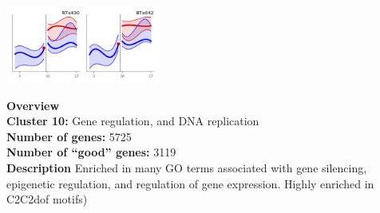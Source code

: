 \begin{multicols}{2}
\includegraphics[width=2in]{figures/clusters/root_Postflowering_9.png}
\columnbreak

\noindent \textbf{Overview}\\\textbf{Cluster 10:} Gene regulation, and DNA replication \\
\textbf{Number of genes:} 5725 \\
\textbf{Number of ``good'' genes:} 3119 \\
\textbf{Description} Enriched in many GO terms associated with gene silencing, epigenetic regulation, and regulation of gene expression. Highly enriched in C2C2dof motifs) \\
\end{multicols}

